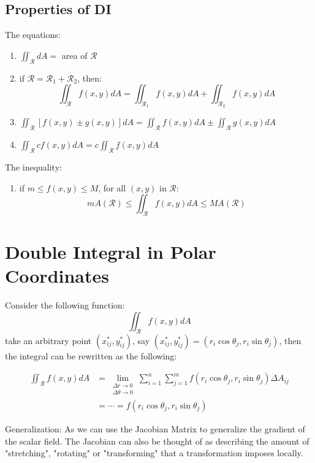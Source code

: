 \documentclass[UTF8,a4paper, 10pt, openany]{svmono}
\begin{document}
\subsection{Properties of DI}
The equations:

\begin{enumerate}
\item $\displaystyle\iint_{\mathcal{R}}dA=$ area of $\mathcal{R}$
\item if $\mathcal{R}=\mathcal{R}_1+\mathcal{R}_2$, then:
$$\iint_{\mathcal{R}}f(x,y)dA=\iint_{\mathcal{R}_1}f(x,y)dA+\iint_{\mathcal{R}_2}f(x,y)dA$$
\item $\displaystyle\iint_{\mathcal{R}}[f(x,y)\pm g(x,y)]dA=\displaystyle\iint_{\mathcal{R}}f(x,y)dA\pm \displaystyle\iint_{\mathcal{R}}g(x,y)dA$
\item $\displaystyle\iint_{\mathcal{R}}cf(x,y)dA=c\displaystyle\iint_{\mathcal{R}}f(x,y)dA$
\end{enumerate}

The inequality:

\begin{enumerate}
\item if $m\leq f(x,y) \leq M$, for all $(x,y)$ in $\mathcal{R}$:
$$mA(\mathcal{R})\leq \iint_{\mathcal{R}}f(x,y)dA \leq MA(\mathcal{R})$$
\end{enumerate}

\section{Double Integral in Polar Coordinates}
Consider the following function:
$$\iint_{\mathcal{R}}f(x,y)dA$$
take an arbitrary point $(x_{ij}^*,y_{ij}^*)$, say $(x_{ij}^*,y_{ij}^*)=(r_{i}\cos \theta_{j},r_{i}\sin \theta_{j})$, then the integral can be rewritten as the following:

\begin{align*}
\iint_{\mathcal{R}}f(x,y)dA &= \lim_{\substack{\Delta r\to 0\\ \Delta \theta\to 0}}\displaystyle\sum_{i=1}^{n}\displaystyle\sum_{j=1}^{m}f(r_{i}\cos \theta_{j},r_{i}\sin \theta_{j})\Delta A_{ij}\\
&=\cdots =f(r_{i}\cos \theta_{j},r_{i}\sin \theta_{j})
\end{align*}

Generalization:
As we can use the Jacobian Matrix to generalize the gradient of the scalar field. The Jacobian can also be thought of as describing the amount of "stretching", "rotating" or "transforming" that a transformation imposes locally. \\
\end{document}
